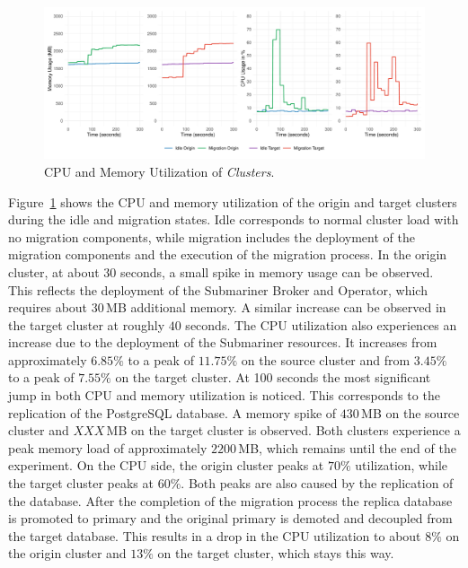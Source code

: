 \begin{figure}[t]
    \centering
    \includegraphics[width=\linewidth]{figures/util-metrics.pdf}
    \caption{CPU and Memory Utilization of \textit{Clusters}. 
    }
    \label{fig:cpu-and-memory-utilization}
\end{figure}
% 
Figure~\ref{fig:cpu-and-memory-utilization} shows the CPU and memory utilization of the origin and target clusters during the idle and migration states.
Idle corresponds to normal cluster load with no migration components, while migration includes the deployment of the migration components and the execution of the migration process. 
In the origin cluster, at about $30$ seconds, a small spike in memory usage can be observed.
This reflects the deployment of the Submariner Broker and Operator, which requires about $30$\,MB additional memory. 
A similar increase can be observed in the target cluster at roughly $40$ seconds.
The CPU utilization also experiences an increase due to the deployment of the Submariner resources.
It increases from approximately $6.85\%$ to a peak of $11.75\%$ on the source cluster and from $3.45\%$ to a peak of $7.55\%$ on the target cluster.
At 100 seconds the most significant jump in both CPU and memory utilization is noticed. 
This corresponds to the replication of the PostgreSQL database.
A memory spike of $430$\,MB on the source cluster and $XXX$\,MB on the target cluster is observed.
Both clusters experience a peak memory load of approximately $2200$\,MB, which remains until the end of the experiment.
On the CPU side, the origin cluster peaks at $70\%$ utilization, while the target cluster peaks at $60\%$.
Both peaks are also caused by the replication of the database.
After the completion of the migration process the replica database is promoted to primary and the original primary is demoted and decoupled from the target database.
This results in a drop in the CPU utilization to about $8\%$ on the origin cluster and $13\%$ on the target cluster, which stays this way.

